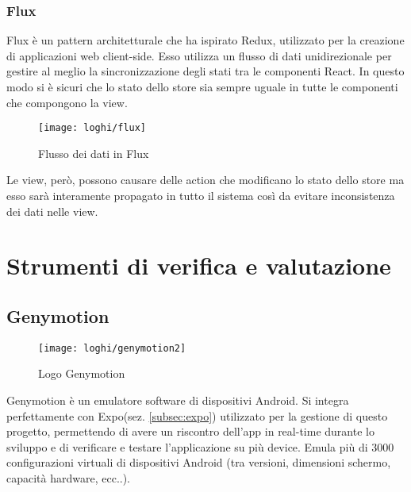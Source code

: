 \subsubsection{Flux} \label{subsubsec:flux}
 Flux è un pattern architetturale che ha ispirato Redux, utilizzato per la 
 creazione di applicazioni web client-side. Esso utilizza un flusso di dati 
 unidirezionale per gestire al meglio la sincronizzazione degli stati tra le 
 componenti React. In questo modo si è sicuri che lo stato dello store sia 
 sempre uguale in tutte le componenti che compongono la view.
 
 \begin{figure}[H] 
 	\centering
 	\texttt{[image: loghi/flux]}
 	\caption{Flusso dei dati in Flux}
 \end{figure}
 Le view, però, possono causare delle action che modificano lo stato dello store 
 ma esso sarà interamente propagato in tutto il sistema così da evitare 
 inconsistenza dei dati nelle view.
 
 
\section{Strumenti di verifica e valutazione}

\subsection{Genymotion} \label{subsez:genymotion}
\begin{figure}[H] 
	\centering
	\texttt{[image: loghi/genymotion2]}
	\caption{Logo Genymotion}
\end{figure}
Genymotion è un emulatore software di dispositivi Android. Si integra 
perfettamente con Expo(sez. \ref{subsec:expo}) utilizzato per la gestione di 
questo progetto, permettendo di avere un riscontro dell'app in real-time durante 
lo sviluppo e di verificare e testare l'applicazione su più device. Emula più 
di 3000 configurazioni virtuali di dispositivi Android (tra versioni, dimensioni 
schermo, capacità hardware, ecc..). 

